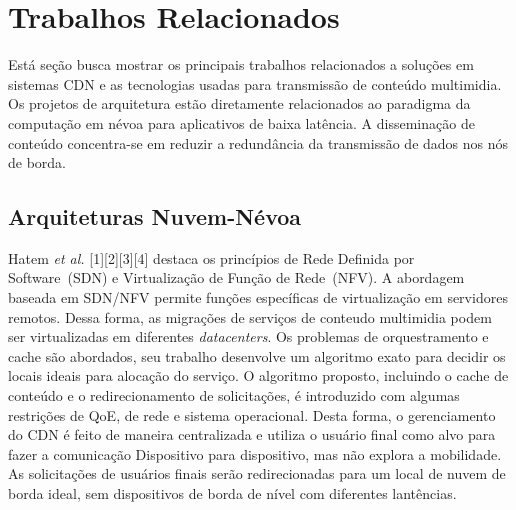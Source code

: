 \section{Trabalhos Relacionados}
\label{ch:related-work}

Está seção busca mostrar os principais trabalhos relacionados a soluções em sistemas CDN e as tecnologias usadas para transmissão de conteúdo multimidia. 
Os projetos de arquitetura estão diretamente relacionados ao paradigma da computação em névoa para aplicativos de baixa latência. A disseminação de conteúdo concentra-se em reduzir a redundância da transmissão de dados nos nós de borda.



\subsection{Arquiteturas Nuvem-Névoa}
\label{subsec:arch-cloud-fog}

Hatem \textit{et al.} [1][2][3][4] destaca os princípios de Rede Definida por Software~(SDN) e Virtualização de Função de Rede~(NFV). A abordagem baseada em SDN/NFV permite funções específicas de virtualização em servidores remotos. Dessa forma, as migrações de serviços de conteudo multimidia podem ser virtualizadas em diferentes \textit{datacenters}. Os problemas de orquestramento e cache são abordados, seu trabalho desenvolve um algoritmo exato para decidir os locais ideais para alocação do serviço. O algoritmo proposto, incluindo o cache de conteúdo e o redirecionamento de solicitações, é introduzido com algumas restrições de QoE, de rede e sistema operacional. 
Desta forma, o gerenciamento do CDN é feito de maneira centralizada e utiliza o usuário final como alvo para fazer a comunicação Dispositivo para dispositivo, mas não explora a mobilidade. As solicitações de usuários finais serão redirecionadas para um local de nuvem de borda ideal, sem dispositivos de borda de nível com diferentes lantências. 


